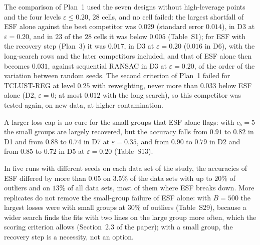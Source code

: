 The comparison of Plan~1 used the seven designs without high-leverage points and the four
levels $\varepsilon\le0.20$, $28$ cells, and no cell failed: the largest shortfall of ESF
alone against the best competitor was $0.029$ (standard error $0.014$), in D3 at
$\varepsilon=0.20$, and in $23$ of the $28$ cells it was below $0.005$ (Table~S1); for ESF with the recovery step (Plan~3) it was $0.017$, in
D3 at $\varepsilon=0.20$ ($0.016$ in D6), with the long-search rows and the later competitors included, and
that of ESF alone then becomes $0.031$, against sequential RANSAC in D3 at
$\varepsilon=0.20$, of the order of the variation between random seeds. The second criterion
of Plan~1 failed for TCLUST-REG at level $0.25$ with reweighting, never more than $0.033$
below ESF alone (D2, $\varepsilon=0$; at most $0.012$ with the long search), so this
competitor was tested again, on new data, at higher contamination.


A larger loss cap is no cure for the small groups that ESF alone flags: with $c_b=5$ the small
groups are largely recovered, but the accuracy falls from $0.91$ to $0.82$ in D1 and from
$0.88$ to $0.74$ in D7 at $\varepsilon=0.35$, and from $0.90$ to $0.79$ in D2 and from $0.85$
to $0.72$ in D5 at $\varepsilon=0.20$ (Table~S13).


In five runs with different seeds on each data set of the study, the accuracies of ESF
differed by more than $0.05$ on $3.5\%$ of the data sets with up to $20\%$ of outliers and on
$13\%$ of all data sets, most of them where ESF breaks down. More replicates do not remove the
small-group failure of ESF alone: with $B=500$ the largest losses were with small groups at
$30\%$ of outliers (Table~S29), because a wider search finds the fits with two lines on the large
group more often, which the scoring criterion allows (Section~2.3 of the paper); with a small
group, the recovery step is a necessity, not an option.

